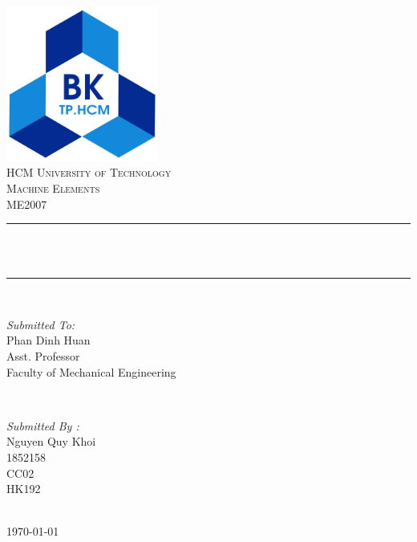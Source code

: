 \documentclass{presets}
\begin{document}
	\begin{titlepage}
		\centering
		\includegraphics[width=5cm]{logo.png}\\[1.0 cm]	%
		\textsc{\LARGE HCM University of Technology}\\[1cm] %
		\textsc{\Large Machine Elements}\\[0.5cm] %
		\textsc{\Large ME2007}\\[0.5 cm]				%
		\rule{\linewidth}{0.2 mm} \\[0.5 cm]
		{ \huge \bfseries \thetitle}\\
		\rule{\linewidth}{0.2 mm} \\[1.5 cm]
		
		\begin{minipage}{0.4\textwidth}
			\begin{flushleft} \large
				\emph{Submitted To:}\\
				Phan Dinh Huan\\
				Asst. Professor\\
				Faculty of Mechanical Engineering\\
			\end{flushleft}
		\end{minipage}~
		\begin{minipage}{0.4\textwidth}
			
			\begin{flushright} \large
				\emph{Submitted By :} \\
				Nguyen Quy Khoi\\
				1852158\\
				CC02\\
				HK192\\
			\end{flushright}
			
		\end{minipage}\\[1.5 cm]
		\mbox{}\vfill
		{\large \today}
	\end{titlepage}
	\tableofcontents
	\listoftables
	\listoffigures
	\newpage
\end{document}

